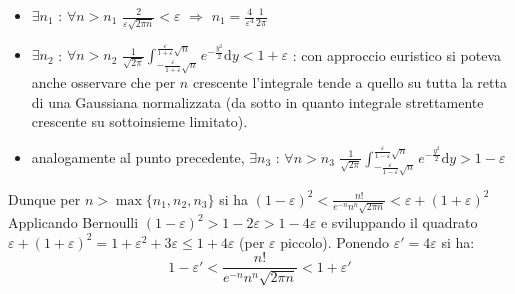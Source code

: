 \documentclass[10pt, oneside]{book}
\theoremstyle{plain}
\begin{document}
\begin{itemize}
    \item $\exists n_1$ : $\forall n> n_1$ $\displaystyle \frac{2}{\varepsilon\sqrt{2\pi n}} < \varepsilon$ $\Rightarrow$ $n_1 = \frac{4}{\varepsilon^4}\frac{1}{2\pi}$
    \item $\exists n_2$ : $\forall n> n_2$ $\displaystyle \frac{1}{\sqrt{2\pi}}\int_{- \frac{\varepsilon}{1+\varepsilon}\sqrt{n}}^{\frac{\varepsilon}{1+\varepsilon}\sqrt{n}} e^{\displaystyle - \frac{y^2}{2}} \textrm{d}y < 1+\varepsilon$ : con approccio euristico si poteva anche osservare che per $n$ crescente l'integrale tende a quello su tutta la retta di una Gaussiana normalizzata (da sotto in quanto integrale strettamente crescente su sottoinsieme limitato).
    \item analogamente al punto precedente, $\exists n_3$ : $\forall n> n_3$ $\displaystyle \frac{1}{\sqrt{2\pi}}\int_{- \frac{\varepsilon}{1-\varepsilon}\sqrt{n}}^{\frac{\varepsilon}{1-\varepsilon}\sqrt{n}} e^{\displaystyle - \frac{y^2}{2}} \textrm{d}y > 1-\varepsilon$
\end{itemize}
Dunque per $n > \max\{n_1, n_2, n_3\}$ si ha $\displaystyle (1-\varepsilon)^2 < \frac{n!}{e^{-n} n^n \sqrt{2\pi n}} < \varepsilon + (1+\varepsilon)^2$
\\Applicando Bernoulli $(1-\varepsilon)^2 > 1 - 2\varepsilon > 1 - 4\varepsilon$ e sviluppando il quadrato $\varepsilon + (1+\varepsilon)^2 = 1 + \varepsilon^2 + 3\varepsilon \leq 1 + 4\varepsilon$ (per $\varepsilon$ piccolo). Ponendo $\varepsilon' = 4\varepsilon$ si ha:
\[1 - \varepsilon' < \frac{n!}{e^{-n} n^n \sqrt{2\pi n}} < 1 + \varepsilon'\]
\end{document}
